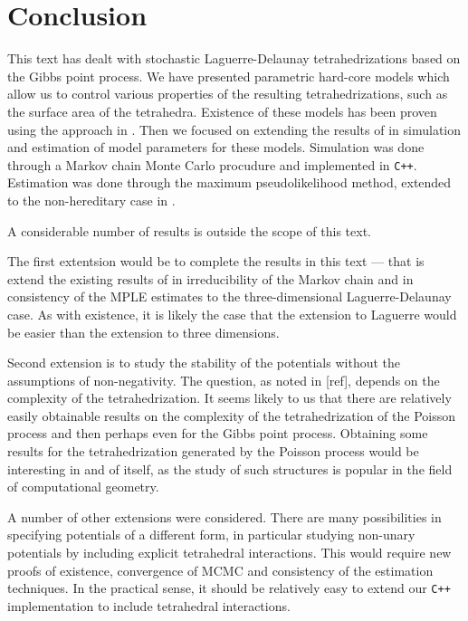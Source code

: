 \chapter*{Conclusion}

This text has dealt with stochastic Laguerre-Delaunay tetrahedrizations based on the Gibbs point process. We have presented parametric hard-core models which allow us to control various properties of the resulting tetrahedrizations, such as the surface area of the tetrahedra. Existence of these models has been proven using the approach in \cite{DDG12}. Then we focused on extending the results of \cite{DereudreLavancier2011} in simulation and estimation of model parameters for these models. Simulation was done through a Markov chain Monte Carlo procudure and implemented in \texttt{C++}. Estimation was done through the maximum pseudolikelihood method, extended to the non-hereditary case in \cite{DereudreLavancier2009}.


A considerable number of results is outside the scope of this text.

The first extentsion would be to complete the results in this text --- that is extend the existing results of \cite{DereudreLavancier2009}  in irreducibility of the Markov chain and \cite{DereudreLavancier2011} in consistency of the MPLE estimates to the three-dimensional Laguerre-Delaunay case. As with existence, it is likely the case that the extension to Laguerre would be easier than the extension to three dimensions. 

Second extension is to study the stability of the potentials without the assumptions of non-negativity. The question, as noted in [ref], depends on the complexity of the tetrahedrization. It seems likely to us that there are relatively easily obtainable results on the complexity of the tetrahedrization of the Poisson process and then perhaps even for the Gibbs point process. Obtaining some results for the tetrahedrization generated by the Poisson process would be interesting in and of itself, as the study of such structures is popular in the field of computational geometry.

A number of other extensions were considered. There are many possibilities in specifying potentials of a different form, in particular studying non-unary potentials by including explicit tetrahedral interactions. This would require new proofs of existence, convergence of MCMC and consistency of the estimation techniques. In the practical sense, it should be relatively easy to extend our \texttt{C++} implementation to include tetrahedral interactions.


